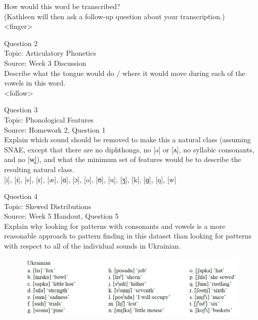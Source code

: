 \documentclass[12pt]{article}
\begin{document}
How would this word be transcribed?\\ (Kathleen will then ask a follow-up question about your transcription.)\\

<finger>


\newpage

{\large Question 2}\\

Topic: Articulatory Phonetics\\
Source: Week 3 Discussion\\

Describe what the tongue would do / where it would move during each of the vowels in this word.\\

<follow>


\newpage

{\large Question 3}\\

Topic: Phonological Features\\
Source: Homework 2, Question 1\\

Explain which sound should be removed to make this a natural class (assuming SNAE, except that there are no diphthongs, no [ə] or [ʌ], no syllabic consonants, and no [w̥]), and what the minimum set of features would be to describe the resulting natural class.\\

{[i]}, {[ɪ]}, {[e]}, {[ɛ]}, {[æ]}, {[ɑ]}, {[ɔ]}, {[o]}, {[ʊ]}, {[u]}, {[ʒ]}, {[k]}, {[ɡ]}, {[ŋ]}, {[w]}


\newpage

{\large Question 4}\\

Topic: Skewed Distributions\\
Source: Week 5 Handout, Question 5\\

Explain why looking for patterns with consonants and vowels is a more reasonable approach to pattern finding in this dataset than looking for patterns with respect to all of the individual sounds in Ukrainian.\\

\begin{figure}[H]
\includegraphics{../images/ukrainian.png}
\end{figure}
\end{document}
